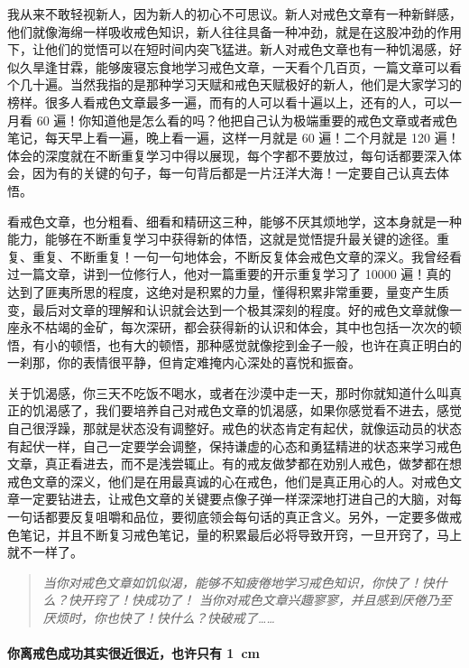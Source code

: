 我从来不敢轻视新人，因为新人的初心不可思议。新人对戒色文章有一种新鲜感，他们就像海绵一样吸收戒色知识，新人往往具备一种冲劲，就是在这股冲劲的作用下，让他们的觉悟可以在短时间内突飞猛进。新人对戒色文章也有一种饥渴感，好似久旱逢甘霖，能够废寝忘食地学习戒色文章，一天看个几百页，一篇文章可以看个几十遍。当然我指的是那种学习天赋和戒色天赋极好的新人，他们是大家学习的榜样。很多人看戒色文章最多一遍，而有的人可以看十遍以上，还有的人，可以一月看 60 遍！你知道他是怎么看的吗？他把自己认为极端重要的戒色文章或者戒色笔记，每天早上看一遍，晚上看一遍，这样一月就是 60 遍！二个月就是 120 遍！体会的深度就在不断重复学习中得以展现，每个字都不要放过，每句话都要深入体会，因为有的关键的句子，每一句背后都是一片汪洋大海！一定要自己认真去体悟。

看戒色文章，也分粗看、细看和精研这三种，能够不厌其烦地学，这本身就是一种能力，能够在不断重复学习中获得新的体悟，这就是觉悟提升最关键的途径。重复、重复、不断重复！一句一句地体会，不断反复体会戒色文章的深义。我曾经看过一篇文章，讲到一位修行人，他对一篇重要的开示重复学习了 10000 遍！真的达到了匪夷所思的程度，这绝对是积累的力量，懂得积累非常重要，量变产生质变，最后对文章的理解和认识就会达到一个极其深刻的程度。好的戒色文章就像一座永不枯竭的金矿，每次深研，都会获得新的认识和体会，其中也包括一次次的顿悟，有小的顿悟，也有大的顿悟，那种感觉就像挖到金子一般，也许在真正明白的一刹那，你的表情很平静，但肯定难掩内心深处的喜悦和振奋。

关于饥渴感，你三天不吃饭不喝水，或者在沙漠中走一天，那时你就知道什么叫真正的饥渴感了，我们要培养自己对戒色文章的饥渴感，如果你感觉看不进去，感觉自己很浮躁，那就是状态没有调整好。戒色的状态肯定有起伏，就像运动员的状态有起伏一样，自己一定要学会调整，保持谦虚的心态和勇猛精进的状态来学习戒色文章，真正看进去，而不是浅尝辄止。有的戒友做梦都在劝别人戒色，做梦都在想戒色文章的深义，他们是在用最真诚的心在戒色，他们是真正用心的人。对戒色文章一定要钻进去，让戒色文章的关键要点像子弹一样深深地打进自己的大脑，对每一句话都要反复咀嚼和品位，要彻底领会每句话的真正含义。另外，一定要多做戒色笔记，并且不断复习戒色笔记，量的积累最后必将导致开窍，一旦开窍了，马上就不一样了。

\begin{quotation}\it
    当你对戒色文章如饥似渴，能够不知疲倦地学习戒色知识，你快了！快什么？快开窍了！快成功了！
    当你对戒色文章兴趣寥寥，并且感到厌倦乃至厌烦时，你也快了！快什么？快破戒了……
\end{quotation}

\paragraph{你离戒色成功其实很近很近，也许只有 \SI{1}{\centi\metre}}

